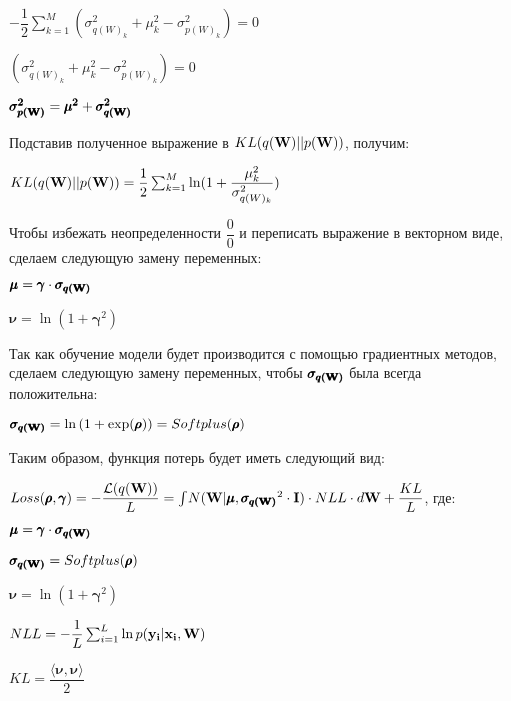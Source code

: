 \documentclass{article}
\begin{document}
$
-\dfrac{1}{2}\sum_{k=1}^{M}(\sigma_{{q(W)_{k}}}^2 + \mu_{k}^2 - \sigma_{{p(W)_{k}}}^2) = 0
$

$
(\sigma_{{q(W)_{k}}}^2 + \mu_{k}^2 - \sigma_{{p(W)_{k}}}^2) = 0
$

$\pmb{\sigma_{p(\bold{W})}^{2}} = \pmb{\mu^{2}} + \pmb{\sigma_{q(\bold{W})}^{2}}$

Подставив полученное выражение в $KL(q(\bold{W}) || p(\bold{W}))$, получим:

$
KL(q(\bold{W}) || p(\bold{W})) = 
\dfrac{1}{2}\sum_{k=1}^{M}\ln({1 + \dfrac{\mu_{k}^2}{\sigma_{{q(W)_{k}}}^2}})
$

Чтобы избежать неопределенности $\dfrac{0}{0}$ и переписать выражение в векторном виде, сделаем следующую замену переменных:

$\pmb{\mu} = \pmb{\gamma} \cdot \pmb{\sigma_{q(\bold{W})}}$

$\pmb{\nu} = \ln{(1 + \pmb{\gamma}^2)}$

Так как обучение модели будет производится с помощью градиентных методов, сделаем следующую замену переменных, чтобы
$\pmb{\sigma_{q(\bold{W})}}$ была всегда положительна:

$\pmb{\sigma_{q(\bold{W})}} = \ln{(1+\exp(\pmb{\rho}))} = Softplus(\pmb{\rho})$

Таким образом, функция потерь будет иметь следующий вид:

$
Loss(\pmb{\rho}, \pmb{\gamma}) =
- \dfrac{\mathcal{L}(q(\bold{W}))}{L} =
\int_{}{} N(\bold{W} | \pmb{\mu}, \pmb{\sigma_{q(\bold{W})}}^{2} \cdot \bold{I}) \cdot NLL \cdot d\bold{W} + \dfrac{KL}{L}
$, где:

$\pmb{\mu} = \pmb{\gamma} \cdot \pmb{\sigma_{q(\bold{W})}}$

$\pmb{\sigma_{q(\bold{W})}} = Softplus(\pmb{\rho})$

$\pmb{\nu} = \ln{(1 + \pmb{\gamma}^2)}$

$NLL = -\dfrac{1}{L}\sum_{i=1}^{L}{\ln{p( \bold{y_{i}} | \bold{x_{i}}, \bold{W})}}$

$KL = \dfrac{\langle  \pmb{\nu}, \pmb{\nu} \rangle}{2}$
\end{document}
